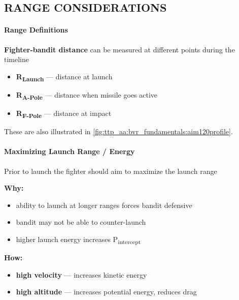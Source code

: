 
\subsection{RANGE CONSIDERATIONS}
\label{sec:ttp_aa:bvr_fundamentals:rangeconsideration}

\paragraph{Range Definitions}
\textbf{Fighter-bandit distance} can be measured at different points during the timeline

\begin{itemize}
    \item \textbf{R\textsubscript{Launch}} --- distance at launch
    \item \textbf{R\textsubscript{A-Pole}} --- distance when missile goes active
    \item \textbf{R\textsubscript{F-Pole}} --- distance at impact
\end{itemize}

These are also illustrated in \cref{fig:ttp_aa:bvr_fundamentals:aim120profile}.

\clearpage

\paragraph{Maximizing Launch Range / Energy}
Prior to launch the fighter should aim to maximize the launch range

\textbf{Why:}
\begin{itemize}
    \item ability to launch at longer ranges forces bandit defensive
    \item bandit may not be able to counter-launch
    \item higher launch energy increases P\textsubscript{intercept} %
\end{itemize}

\textbf{How:}
\begin{itemize}
    \item \textbf{high velocity} --- increases kinetic energy 
    \item \textbf{high altitude} --- increases potential energy, reduces drag
\end{itemize}

